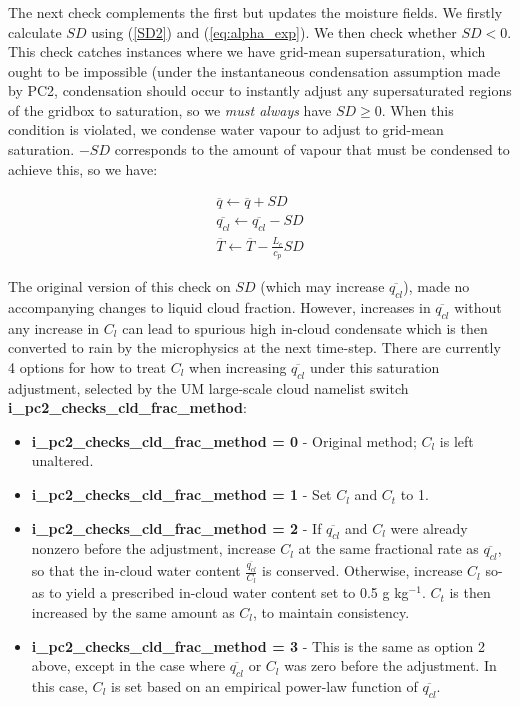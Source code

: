\documentclass{UMDP_article}
\begin{document}
\subsubsection{} 
\label{sec:pc2_checks_sd} 
The next check complements the first but updates the moisture fields. 
We firstly calculate $SD$ using (\ref{SD2}) and
(\ref{eq:alpha_exp}). We then check whether $SD < 0$.
This check catches instances where we have grid-mean supersaturation,
which ought to be impossible (under the instantaneous condensation
assumption made by PC2, condensation should occur to instantly adjust
any supersaturated regions of the gridbox to saturation, so we
{\it must always} have $SD \ge 0$.
When this condition is violated, we condense water vapour to adjust to
grid-mean saturation. $-SD$ corresponds to the amount of vapour that must be
condensed to achieve this, so we have:

\begin{eqnarray}
\overline{q} \leftarrow \overline{q} + SD  \nonumber \\
\overline{q_{cl}} \leftarrow \overline{q_{cl}} - SD \nonumber \\
\overline{T} \leftarrow \overline{T} - \frac{L_c}{c_p} SD
\label{eq:qsdcheck1}
\end{eqnarray}

The original version of this check on $SD$
(which may increase $\overline{q_{cl}}$), made no accompanying changes to
liquid cloud fraction.  However, increases in $\overline{q_{cl}}$
without any increase in $C_l$ can lead to spurious high in-cloud condensate
which is then converted to rain by the microphysics at the next time-step.
There are currently 4 options for how to treat $C_l$ when increasing
$\overline{q_{cl}}$ under this saturation adjustment, selected by the
UM large-scale cloud namelist switch {\bf i\_pc2\_checks\_cld\_frac\_method}:
\begin{itemize}
\item {\bf i\_pc2\_checks\_cld\_frac\_method = 0} -
Original method; $C_l$ is left unaltered.
\item {\bf i\_pc2\_checks\_cld\_frac\_method = 1} -
Set $C_l$ and $C_t$ to 1.
\item {\bf i\_pc2\_checks\_cld\_frac\_method = 2} -
If $\overline{q_{cl}}$ and $C_l$ were already nonzero before the adjustment,
increase $C_l$ at the same fractional rate as $\overline{q_{cl}}$, so that
the in-cloud water content $\frac{\overline{q_{cl}}}{C_l}$ is conserved.
Otherwise, increase $C_l$ so-as to yield a prescribed in-cloud water
content set to 0.5 g kg$^{-1}$.  $C_t$ is then increased by the same
amount as $C_l$, to maintain consistency.
\item {\bf i\_pc2\_checks\_cld\_frac\_method = 3} -
This is the same as option 2 above, except in the case where
$\overline{q_{cl}}$ or $C_l$ was zero before the adjustment.  In this case,
$C_l$ is set based on an empirical power-law function of $\overline{q_{cl}}$.
\end{itemize}
\end{document}

